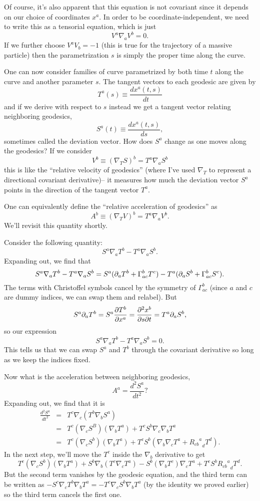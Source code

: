 Of course, it's also apparent that this equation is not covariant since it depends on our choice of coordinates $x^a$. In order to be coordinate-independent, we need to write this as a tensorial equation, which is just
$$V^a\nabla_a V^b=0.$$ If we further choose $V^a V_b=-1$ (this is true for the trajectory of a massive particle) then the parametrization $s$ is simply the proper time along the curve.

One can now consider families of curve parametrized by both time $t$ along the curve and another parameter $s$. The tangent vectors to each geodesic are given by
$$T^a(s) \equiv \frac{dx^a(t,s)}{dt}$$
and if we derive with respect to $s$ instead we get a tangent vector relating neighboring geodesics,
$$S^a(t)\equiv\frac{dx^a(t,s)}{ds},$$
sometimes called the deviation vector.
How does $S^a$ change as one moves along the geodesics? If we consider
$$V^b \equiv (\nabla_T S)^b=T^a\nabla_a S^b$$ this is like the ``relative velocity of geodesics'' (where I've used $\nabla_T$ to represent a directional covariant derivative)-- it measures how much the deviation vector $S^a$ points in the direction of the tangent vector $T^a$.

One can equivalently define the ``relative acceleration of geodesics'' as
$$A^b \equiv (\nabla_T V)^b = T^a \nabla_a V^b.$$ We'll revisit this quantity shortly.

\begin{lem}
Consider the following quantity:
$$S^a \nabla_a T^b-T^a \nabla_a S^b.$$ 
Expanding out, we find that $$S^a\nabla_a T^b- T^a \nabla_a S^b= S^a (\partial_a T^b +\Gamma^b_{ac} T^c) - T^a (\partial_a S^b +\Gamma^b_{ac} S^c).$$
The terms with Christoffel symbols cancel by the symmetry of $\Gamma^b_{ac}$ (since $a$ and $c$ are dummy indices, we can swap them and relabel). But $$S^a \partial_a T^b = S^a \frac{\partial T^b}{\partial x^a} = \frac{\partial^2 x^b}{\partial s\partial t} = T^a \partial_a S^b,$$
so our expression
$$S^a \nabla_a T^b-T^a \nabla_a S^b=0.$$
This tells us that we can swap $S^a$ and $T^b$ through the covariant derivative so long as we keep the indices fixed.
\end{lem}

Now what is the acceleration between neighboring geodesics,
$$A^a =\frac{d^2S^a}{dt^2}?$$
Expanding out, we find that it is
\begin{eqnarray*}
\frac{d^2S^a}{dt^2}&=&T^c \nabla_c(T^b \nabla_b S^a)\\
&=&T^c (\nabla_c S^B)(\nabla_b T^a)+T^c S^b \nabla_c \nabla_b T^a\\
&=& T^c(\nabla_c S^b)(\nabla_b T^a)+T^c S^b(\nabla_b \nabla_c T^a +{{R_{cb}}^a}_d T^d).
\end{eqnarray*}
In the next step, we'll move the $T^c$ inside the $\nabla_b$ derivative to get
$$T^c(\nabla_c S^b)(\nabla_b T^a)+S^b\nabla_b(T^c \nabla_c T^a) - S^b(\nabla_b T^c) \nabla_c T^a+T^c S^b{{R_{cb}}^a}_d T^d.$$
But the second term vanishes by the geodesic equation, and the third term can be written as
$-S^c \nabla_c T^b \nabla_b T^a = -T^c \nabla_c S^b \nabla_b T^a$ (by the identity we proved earlier) so the third term cancels the first one.

